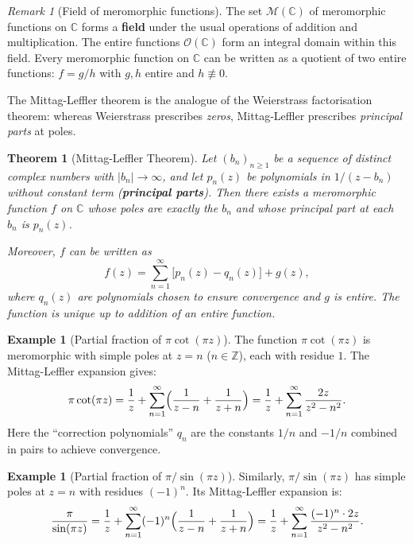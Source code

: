 \documentclass[12pt,a4paper,openany]{book}
\theoremstyle{definition}
\newtheorem{example}[definition]{Example}
\theoremstyle{plain}
\newtheorem{theorem}[definition]{Theorem}
\theoremstyle{remark}
\newtheorem{remark}[definition]{Remark}
\newcommand{\C}{\mathbb{C}}
\newcommand{\Z}{\mathbb{Z}}
\newcommand{\abs}[1]{\left|#1\right|}
\begin{document}
\begin{remark}[Field of meromorphic functions]\label{rem:meromorphic-field}
The set $\mathcal{M}(\C)$ of meromorphic functions on $\C$ forms a
\textbf{field} under the usual operations of addition and multiplication.
The entire functions $\mathcal{O}(\C)$ form an integral domain within
this field. Every meromorphic function on $\C$ can be written as a
quotient of two entire functions: $f = g/h$ with $g, h$ entire and
$h \not\equiv 0$.
\end{remark}

The Mittag-Leffler theorem is the analogue of the Weierstrass factorisation
theorem: whereas Weierstrass prescribes \emph{zeros}, Mittag-Leffler
prescribes \emph{principal parts} at poles.

\begin{theorem}[Mittag-Leffler Theorem]\label{thm:mittag-leffler}
Let $(b_n)_{n \geq 1}$ be a sequence of distinct complex numbers with
$\abs{b_n} \to \infty$, and let $p_n(z)$ be polynomials in $1/(z-b_n)$
without constant term (\textbf{principal parts}). Then there exists a
meromorphic function $f$ on $\C$ whose poles are exactly the $b_n$
and whose principal part at each $b_n$ is $p_n(z)$.

Moreover, $f$ can be written as
\[
  f(z) = \sum_{n=1}^{\infty}\bigl[p_n(z) - q_n(z)\bigr] + g(z),
\]
where $q_n(z)$ are polynomials chosen to ensure convergence and $g$ is entire.
The function is unique up to addition of an entire function.
\end{theorem}

\begin{example}[Partial fraction of $\pi\cot(\pi z)$]\label{ex:cot-partial}
The function $\pi\cot(\pi z)$ is meromorphic with simple poles at
$z = n$ ($n \in \Z$), each with residue $1$. The Mittag-Leffler expansion gives:
\begin{equation}\label{eq:cot-expansion}
  \pi\cot(\pi z)
  = \frac{1}{z} + \sum_{n=1}^{\infty}\Bigl(\frac{1}{z-n}+\frac{1}{z+n}\Bigr)
  = \frac{1}{z} + \sum_{n=1}^{\infty}\frac{2z}{z^2-n^2}.
\end{equation}
Here the ``correction polynomials'' $q_n$ are the constants $1/n$ and $-1/n$
combined in pairs to achieve convergence.
\end{example}

\begin{example}[Partial fraction of $\pi/\sin(\pi z)$]\label{ex:csc-partial}
Similarly, $\pi/\sin(\pi z)$ has simple poles at $z = n$ with residues
$(-1)^n$. Its Mittag-Leffler expansion is:
\[
  \frac{\pi}{\sin(\pi z)} = \frac{1}{z}
  + \sum_{n=1}^{\infty}(-1)^n\Bigl(\frac{1}{z-n}+\frac{1}{z+n}\Bigr)
  = \frac{1}{z}
  + \sum_{n=1}^{\infty}\frac{(-1)^n \cdot 2z}{z^2-n^2}.
\]
\end{example}
\end{document}
